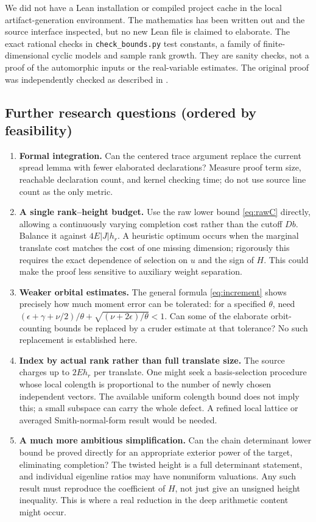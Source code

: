 \documentclass[11pt]{article}
\theoremstyle{remark}\newtheorem{remark}[theorem]{Remark}
\begin{document}
We did not have a Lean installation or compiled project cache in the local artifact-generation environment. The mathematics has been written out and the source interface inspected, but no new Lean file is claimed to elaborate. The exact rational checks in \texttt{check\_bounds.py} test constants, a family of finite-dimensional cyclic models and sample rank growth. They are sanity checks, not a proof of the automorphic inputs or the real-variable estimates. The original proof was independently checked as described in \cite{verify}.

\subsection{Further research questions (ordered by feasibility)}
\begin{enumerate}[leftmargin=*]
\item \textbf{Formal integration.} Can the centered trace argument replace the current spread lemma with fewer elaborated declarations? Measure proof term size, reachable declaration count, and kernel checking time; do not use source line count as the only metric.
\item \textbf{A single rank--height budget.} Use the raw lower bound \eqref{eq:rawC} directly, allowing a continuously varying completion cost rather than the cutoff $Db$. Balance it against $4E|J|h_r$. A heuristic optimum occurs when the marginal translate cost matches the cost of one missing dimension; rigorously this requires the exact dependence of selection on $u$ and the sign of $H$. This could make the proof less sensitive to auxiliary weight separation.
\item \textbf{Weaker orbital estimates.} The general formula \eqref{eq:increment} shows precisely how much moment error can be tolerated: for a specified $\theta$, need $(\epsilon+\gamma+\nu/2)/\theta+\sqrt{(\nu+2\epsilon)/\theta}<1$. Can some of the elaborate orbit-counting bounds be replaced by a cruder estimate at that tolerance? No such replacement is established here.
\item \textbf{Index by actual rank rather than full translate size.} The source charges up to $2Eh_r$ per translate. One might seek a basis-selection procedure whose local colength is proportional to the number of newly chosen independent vectors. The available uniform colength bound does not imply this; a small subspace can carry the whole defect. A refined local lattice or averaged Smith-normal-form result would be needed.
\item \textbf{A much more ambitious simplification.} Can the chain determinant lower bound be proved directly for an appropriate exterior power of the target, eliminating completion? The twisted height is a full determinant statement, and individual eigenline ratios may have nonuniform valuations. Any such result must reproduce the coefficient of $H$, not just give an unsigned height inequality. This is where a real reduction in the deep arithmetic content might occur.
\end{enumerate}
\end{document}
